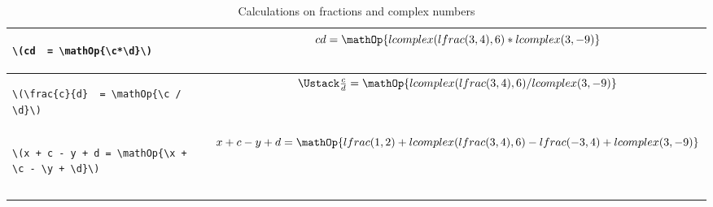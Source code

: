 \documentclass{article}
\begin{document}
\begin{center}
\begin{longtable}{lc}
\begin{lstlisting}
\(cd  = \mathOp{\c*\d}\)
\end{lstlisting}
&  \(cd  = \mathOp{\c*\d}\) \\ \hline

\begin{lstlisting}
\(\frac{c}{d}  = \mathOp{\c / \d}\)
\end{lstlisting}
& \(\frac{c}{d}  = \mathOp{\c / \d}\) \\ \hline

\begin{lstlisting}
\(x + c - y + d = \mathOp{\x + \c - \y + \d}\)
\end{lstlisting}
& \(x + c - y + d = \mathOp{\x + \c - \y + \d}\) \\ 

 \bottomrule \\ 
\caption{Calculations on fractions and complex numbers}
\label{tbl:illluamaths2}
\end{longtable}
\end{center}
\printbibliography
\end{document}
